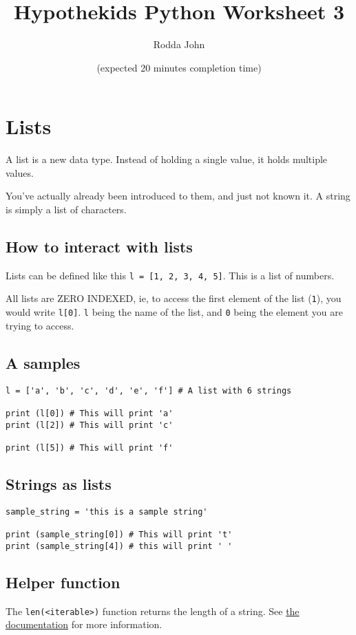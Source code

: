 \documentclass[11pt]{article}
\author{Rodda John}
\date{(expected 20 minutes completion time)}
\title{Hypothekids Python Worksheet 3}
\begin{document}
\maketitle

\section{Lists}
\label{sec:org7418924}
A list is a new data type.  Instead of holding a single value, it holds multiple values.

You've actually already been introduced to them, and just not known it.  A string is simply a list of characters.

\subsection{How to interact with lists}
\label{sec:org10243bf}
Lists can be defined like this \texttt{l = [1, 2, 3, 4, 5]}.  This is a list of numbers.

All lists are ZERO INDEXED, ie, to access the first element of the list (\texttt{1}), you would write \texttt{l[0]}.  \texttt{l} being the name of the list, and \texttt{0} being the element you are trying to access.

\subsection{A samples}
\label{sec:org6aae5cd}

\begin{verbatim}
l = ['a', 'b', 'c', 'd', 'e', 'f'] # A list with 6 strings

print (l[0]) # This will print 'a'
print (l[2]) # This will print 'c'

print (l[5]) # This will print 'f'
\end{verbatim}

\subsection{Strings as lists}
\label{sec:org852edd5}
\begin{verbatim}
sample_string = 'this is a sample string'

print (sample_string[0]) # This will print 't'
print (sample_string[4]) # this will print ' '
\end{verbatim}

\subsection{Helper function}
\label{sec:org89c855b}
The \texttt{len(<iterable>)} function returns the length of a string.  See \href{https://docs.python.org/3/library/functions.html\#len}{the documentation} for more information.
\end{document}
